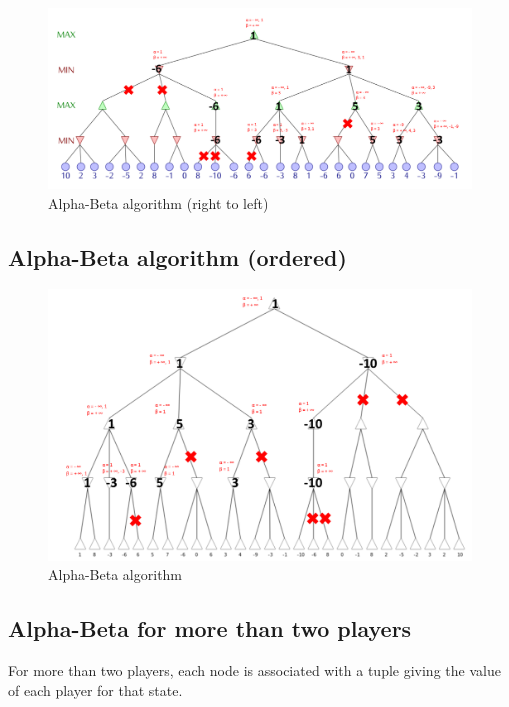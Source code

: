 \documentclass[en]{article}
\begin{document}
\begin{figure}[H]
 \centering
 \includegraphics[width=\textwidth]{Alphabeta_reverse.png}
 \caption{Alpha-Beta algorithm (right to left)}
 \label{fig:alphabeta_reverse}
\end{figure}


\subsection{Alpha-Beta algorithm (ordered)}

\begin{figure}[H]
 \centering
 \includegraphics[width=\textwidth]{Alphabeta_ordered.png}
 \caption{Alpha-Beta algorithm}
 \label{fig:alphabeta_ordered}
\end{figure}

\subsection{Alpha-Beta for more than two players}

For more than two players, each node is associated with a tuple giving the value of each player for that state.
\end{document}
